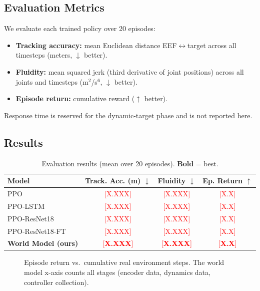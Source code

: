 \documentclass{article}
\newcommand{\TODO}[1]{\textcolor{red}{[#1]}}
\begin{document}
\subsection{Evaluation Metrics}

We evaluate each trained policy over 20 episodes:
\begin{itemize}
  \item \textbf{Tracking accuracy:} mean Euclidean distance EEF$\leftrightarrow$target
        across all timesteps (meters, $\downarrow$ better).
  \item \textbf{Fluidity:} mean squared jerk (third derivative of joint positions)
        across all joints and timesteps (m$^2$/s$^6$, $\downarrow$ better).
  \item \textbf{Episode return:} cumulative reward ($\uparrow$ better).
\end{itemize}
Response time is reserved for the dynamic-target phase and is not reported here.

\subsection{Results}

\begin{table}[h]
\centering
\caption{
  Evaluation results (mean over 20 episodes).
  \textbf{Bold} = best.
}
\label{tab:results}
\small
\begin{tabular}{lccc}
\toprule
Model & Track. Acc. (m) $\downarrow$ & Fluidity $\downarrow$ & Ep. Return $\uparrow$ \\
\midrule
PPO                & \TODO{X.XXX} & \TODO{X.XXX} & \TODO{X.X} \\
PPO-LSTM           & \TODO{X.XXX} & \TODO{X.XXX} & \TODO{X.X} \\
PPO-ResNet18       & \TODO{X.XXX} & \TODO{X.XXX} & \TODO{X.X} \\
PPO-ResNet18-FT    & \TODO{X.XXX} & \TODO{X.XXX} & \TODO{X.X} \\
\textbf{World Model (ours)} & \TODO{\textbf{X.XXX}} & \TODO{\textbf{X.XXX}} & \TODO{\textbf{X.X}} \\
\bottomrule
\end{tabular}
\end{table}

\begin{figure}[t]
  \centering
  \caption{
    Episode return vs.\ cumulative real environment steps.
    The world model x-axis counts all stages (encoder data, dynamics data, controller collection).
  }
  \label{fig:curves}
\end{figure}
\end{document}
